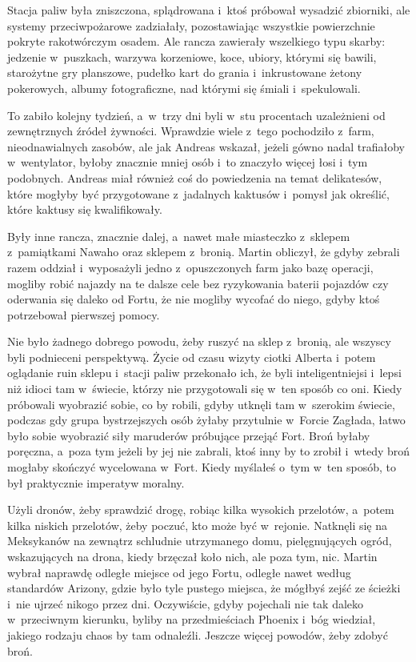\documentclass[oneside,polish,11pt,sfheadings]{mwbk}
\begin{document}
Stacja paliw była zniszczona, splądrowana i~ktoś próbował wysadzić
zbiorniki, ale systemy przeciwpożarowe zadziałały, pozostawiając
wszystkie powierzchnie pokryte rakotwórczym osadem. Ale rancza zawierały
wszelkiego typu skarby: jedzenie w~puszkach, warzywa korzeniowe, koce,
ubiory, którymi się bawili, starożytne gry planszowe, pudełko kart do
grania i~inkrustowane żetony pokerowych, albumy fotograficzne, nad
którymi się śmiali i~spekulowali.

To zabiło kolejny tydzień, a~w~trzy dni byli w~stu procentach
uzależnieni od zewnętrznych źródeł żywności. Wprawdzie wiele z~tego
pochodziło z~farm, nieodnawialnych zasobów, ale jak Andreas wskazał,
jeżeli gówno nadal trafiałoby w~wentylator, byłoby znacznie mniej osób i~to znaczyło więcej łosi i~tym podobnych. Andreas miał również coś do
powiedzenia na temat delikatesów, które mogłyby być przygotowane z~jadalnych kaktusów i~pomysł jak określić, które kaktusy się
kwalifikowały.

Były inne rancza, znacznie dalej, a~nawet małe miasteczko z~sklepem z~pamiątkami Nawaho oraz sklepem z~bronią. Martin obliczył, że gdyby
zebrali razem oddział i~wyposażyli jedno z~opuszczonych farm jako bazę
operacji, mogliby robić najazdy na te dalsze cele bez ryzykowania
baterii pojazdów czy oderwania się daleko od Fortu, że nie mogliby
wycofać do niego, gdyby ktoś potrzebował pierwszej pomocy.

Nie było żadnego dobrego powodu, żeby ruszyć na sklep z~bronią, ale
wszyscy byli podnieceni perspektywą. Życie od czasu wizyty ciotki
Alberta i~potem oglądanie ruin sklepu i~stacji paliw przekonało ich, że
byli inteligentniejsi i~lepsi niż idioci tam w~świecie, którzy nie
przygotowali się w~ten sposób co oni. Kiedy próbowali wyobrazić sobie,
co by robili, gdyby utknęli tam w~szerokim świecie, podczas gdy grupa
bystrzejszych osób żyłaby przytulnie w~Forcie Zagłada, łatwo było sobie
wyobrazić siły maruderów próbujące przejąć Fort. Broń byłaby poręczna, a~poza tym jeżeli by jej nie zabrali, ktoś inny by to zrobił i~wtedy broń
mogłaby skończyć wycelowana w~Fort. Kiedy myślałeś o~tym w~ten sposób,
to był praktycznie imperatyw moralny.

Użyli dronów, żeby sprawdzić drogę, robiąc kilka wysokich przelotów, a~potem kilka niskich przelotów, żeby poczuć, kto może być w~rejonie.
Natknęli się na Meksykanów na zewnątrz schludnie utrzymanego domu,
pielęgnujących ogród, wskazujących na drona, kiedy brzęczał koło nich,
ale poza tym, nic. Martin wybrał naprawdę odległe miejsce od jego Fortu,
odległe nawet według standardów Arizony, gdzie było tyle pustego
miejsca, że mógłbyś zejść ze ścieżki i~nie ujrzeć nikogo przez dni.
Oczywiście, gdyby pojechali nie tak daleko w~przeciwnym kierunku, byliby
na przedmieściach Phoenix i~bóg wiedział, jakiego rodzaju chaos by tam
odnaleźli. Jeszcze więcej powodów, żeby zdobyć broń.
\end{document}
